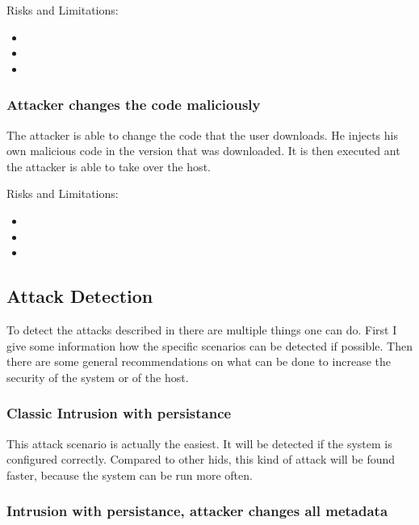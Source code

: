 Risks and Limitations:
\begin{itemize}
	\item {}
	\item {}
	\item {}
\end{itemize}

\subsubsection{Attacker changes the code maliciously}
\label{sec:attack:codechange}

The attacker is able to change the code that the user downloads. He injects his own malicious code in the version that was downloaded. It is then executed ant the attacker is able to take over the host.

Risks and Limitations:
\begin{itemize}
	\item {}
	\item {}
	\item {}
\end{itemize}

\subsection{Attack Detection}
\label{sec:mittigations}

To detect the attacks described in  there are multiple things one can do. First I give some information how the specific scenarios can be detected if possible. Then there are some general recommendations on what can be done to increase the security of the system or of the host.

\subsubsection{Classic Intrusion with persistance}
\label{sec:defense:classic}

This attack scenario is actually the easiest. It will be detected if the system is configured correctly. Compared to other \gls{hids}, this kind of attack will be found faster, because the system can be run more often. 

\subsubsection{Intrusion with persistance, attacker changes all metadata}
\label{sec:defense:changeattr}

